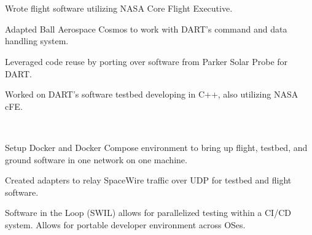 \documentclass[]{deedy-resume-openfont}
\begin{document}
\hfill{}\\
\hfill {}\\
	\begin{tightemize}
		\item Wrote flight software utilizing NASA Core Flight Executive.
		\item Adapted Ball Aerospace Cosmos to work with DART's command and data handling system.
		\item Leveraged code reuse by porting over software from Parker Solar Probe for DART.
		\item Worked on DART's software testbed developing in C++, also utilizing NASA cFE.
	\end{tightemize}

\\
\begin{tightemize}
	\item Setup Docker and Docker Compose environment to bring up flight, testbed, and ground software in one network on one machine.
	\item Created adapters to relay SpaceWire traffic over UDP for testbed and flight software.
	\item Software in the Loop (SWIL) allows for parallelized testing within a CI/CD system. Allows for portable developer environment across OSes.
\end{tightemize}
	
\end{document}
